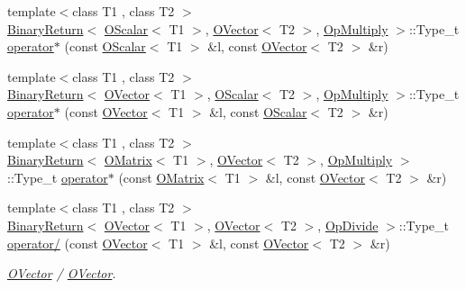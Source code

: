 \begin{DoxyCompactItemize}
\item 
{\footnotesize template$<$class T1 , class T2 $>$ }\\\mbox{\hyperlink{structENSEM_1_1BinaryReturn}{Binary\+Return}}$<$ \mbox{\hyperlink{classENSEM_1_1OScalar}{O\+Scalar}}$<$ T1 $>$, \mbox{\hyperlink{classENSEM_1_1OVector}{O\+Vector}}$<$ T2 $>$, \mbox{\hyperlink{structENSEM_1_1OpMultiply}{Op\+Multiply}} $>$\+::Type\+\_\+t \mbox{\hyperlink{group__obsvector_ga8b90f37dfc2d857d5ba547b2639cc97e}{operator$\ast$}} (const \mbox{\hyperlink{classENSEM_1_1OScalar}{O\+Scalar}}$<$ T1 $>$ \&l, const \mbox{\hyperlink{classENSEM_1_1OVector}{O\+Vector}}$<$ T2 $>$ \&r)
\item 
{\footnotesize template$<$class T1 , class T2 $>$ }\\\mbox{\hyperlink{structENSEM_1_1BinaryReturn}{Binary\+Return}}$<$ \mbox{\hyperlink{classENSEM_1_1OVector}{O\+Vector}}$<$ T1 $>$, \mbox{\hyperlink{classENSEM_1_1OScalar}{O\+Scalar}}$<$ T2 $>$, \mbox{\hyperlink{structENSEM_1_1OpMultiply}{Op\+Multiply}} $>$\+::Type\+\_\+t \mbox{\hyperlink{group__obsvector_gabb4c9b103a03a23a7cc8db755ded0b7c}{operator$\ast$}} (const \mbox{\hyperlink{classENSEM_1_1OVector}{O\+Vector}}$<$ T1 $>$ \&l, const \mbox{\hyperlink{classENSEM_1_1OScalar}{O\+Scalar}}$<$ T2 $>$ \&r)
\item 
{\footnotesize template$<$class T1 , class T2 $>$ }\\\mbox{\hyperlink{structENSEM_1_1BinaryReturn}{Binary\+Return}}$<$ \mbox{\hyperlink{classENSEM_1_1OMatrix}{O\+Matrix}}$<$ T1 $>$, \mbox{\hyperlink{classENSEM_1_1OVector}{O\+Vector}}$<$ T2 $>$, \mbox{\hyperlink{structENSEM_1_1OpMultiply}{Op\+Multiply}} $>$\+::Type\+\_\+t \mbox{\hyperlink{group__obsvector_ga7ba413a9121973912be1ff1686cec922}{operator$\ast$}} (const \mbox{\hyperlink{classENSEM_1_1OMatrix}{O\+Matrix}}$<$ T1 $>$ \&l, const \mbox{\hyperlink{classENSEM_1_1OVector}{O\+Vector}}$<$ T2 $>$ \&r)
\item 
{\footnotesize template$<$class T1 , class T2 $>$ }\\\mbox{\hyperlink{structENSEM_1_1BinaryReturn}{Binary\+Return}}$<$ \mbox{\hyperlink{classENSEM_1_1OVector}{O\+Vector}}$<$ T1 $>$, \mbox{\hyperlink{classENSEM_1_1OVector}{O\+Vector}}$<$ T2 $>$, \mbox{\hyperlink{structENSEM_1_1OpDivide}{Op\+Divide}} $>$\+::Type\+\_\+t \mbox{\hyperlink{group__obsvector_ga85053dcc452aa903b53e9b24dc0d5fb9}{operator/}} (const \mbox{\hyperlink{classENSEM_1_1OVector}{O\+Vector}}$<$ T1 $>$ \&l, const \mbox{\hyperlink{classENSEM_1_1OVector}{O\+Vector}}$<$ T2 $>$ \&r)
\begin{DoxyCompactList}\small\item\em \mbox{\hyperlink{classENSEM_1_1OVector}{O\+Vector}} / \mbox{\hyperlink{classENSEM_1_1OVector}{O\+Vector}}. \end{DoxyCompactList}\item 

\end{DoxyCompactItemize}
